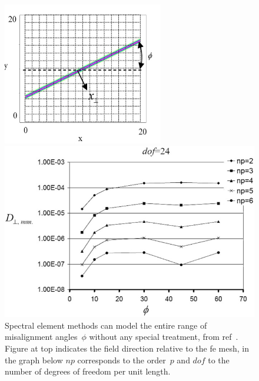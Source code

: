 \begin{figure}[h]
\centerline{\includegraphics[width=7.0cm]{../png/dirn.png}}
\centerline{\includegraphics[width=13.0cm]{../png/dirdifus.png}}
\caption{Spectral element methods can model the entire range of misalignment
angles~$\phi$ without any special treatment,
from ref~\protect\cite{Me10Spec}. Figure at top indicates the field direction
relative to the fe mesh,
in the graph below $np$ corresponds to
the order~$p$ and $dof$ to the number of degrees of freedom per unit length.
\label{fig:aniso}}
\end{figure}

